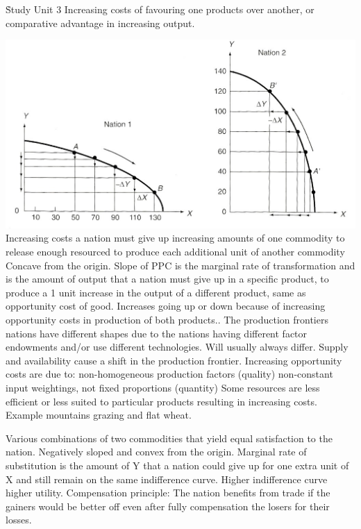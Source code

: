 \documentclass[12pt]{examnotes}
\begin{document}
\h{Study Unit 3}
Increasing costs of favouring one products over another, or comparative advantage in increasing output.

\includegraphics[scale=0.4]{./imgs/31.jpg}
\ra Increasing costs a nation must give up increasing amounts of one commodity to release enough resourced to produce each additional unit of another commodity 
\ra Concave from the origin. 
\ra Slope of PPC is the marginal rate of transformation and is the amount of output that a nation must give up in a specific product, to produce a 1 unit increase in the output of a different product, same as opportunity cost of good.
\ra Increases going up or down because of increasing opportunity costs in production of both products..
\ra The production frontiers nations have different shapes due to the nations having different factor endowments and/or use different technologies. Will usually always differ. Supply and availability cause a shift in the production frontier.
\ra Increasing opportunity costs are due to:
 non-homogeneous production factors (quality)
 non-constant input weightings, not fixed proportions (quantity)
\ra Some resources are less efficient or less suited to particular products resulting in increasing costs.
\ra Example mountains grazing and flat wheat.

\ra Various combinations of two commodities that yield equal satisfaction to the nation.
\ra Negatively sloped and convex from the origin.
\ra Marginal rate of substitution is the amount of Y that a nation could give up for one extra unit of X and still remain on the same indifference curve.
\ra Higher indifference curve higher utility.
\ra Compensation principle: The nation benefits from trade if the gainers would be better off even after fully compensation the losers for their losses. 
\end{document}
